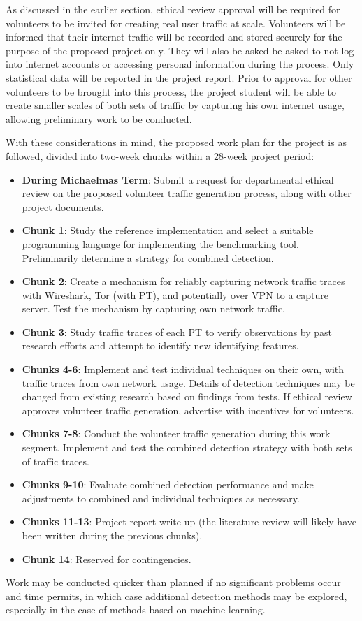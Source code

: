 \documentclass[11pt]{article}
\begin{document}
As discussed in the earlier section, ethical review approval will be required for volunteers to be invited for creating real user traffic at scale. Volunteers will be informed that their internet traffic will be recorded and stored securely for the purpose of the proposed project only. They will also be asked be asked to not log into internet accounts or accessing personal information during the process. Only statistical data will be reported in the project report. Prior to approval for other volunteers to be brought into this process, the project student will be able to create smaller scales of both sets of traffic by capturing his own internet usage, allowing preliminary work to be conducted.

With these considerations in mind, the proposed work plan for the project is as followed, divided into two-week chunks within a 28-week project period:

\begin{itemize}
	\item \textbf{During Michaelmas Term}: Submit a request for departmental ethical review on the proposed volunteer traffic generation process, along with other project documents.
	\item \textbf{Chunk 1}: Study the reference implementation and select a suitable programming language for implementing the benchmarking tool. Preliminarily determine a strategy for combined detection.
	\item \textbf{Chunk 2}: Create a mechanism for reliably capturing network traffic traces with Wireshark, Tor (with PT), and potentially over VPN to a capture server. Test the mechanism by capturing own network traffic.
	\item \textbf{Chunk 3}: Study traffic traces of each PT to verify observations by past research efforts and attempt to identify new identifying features.
	\item \textbf{Chunks 4-6}: Implement and test individual techniques on their own, with traffic traces from own network usage. Details of detection techniques may be changed from existing research based on findings from tests.  If ethical review approves volunteer traffic generation, advertise with incentives for volunteers.
	\item \textbf{Chunks 7-8}: Conduct the volunteer traffic generation during this work segment. Implement and test the combined detection strategy with both sets of traffic traces. 
	\item \textbf{Chunks 9-10}: Evaluate combined detection performance and make adjustments to combined and individual techniques as necessary.
	\item \textbf{Chunks 11-13}: Project report write up (the literature review will likely have been written during the previous chunks).
	\item \textbf{Chunk 14}: Reserved for contingencies.
\end{itemize}

Work may be conducted quicker than planned if no significant problems occur and time permits, in which case additional detection methods may be explored, especially in the case of methods based on machine learning.


\footnotesize{}
\end{document}
